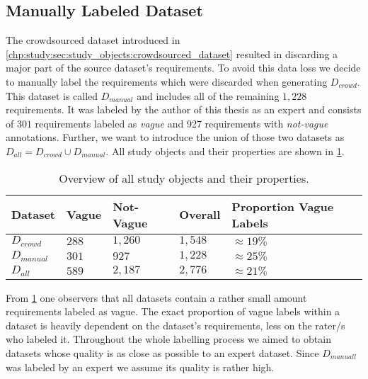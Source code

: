 \subsection{Manually Labeled Dataset}
\label{chp:study:sec:study_objects:dataset_creation:manual_labeling}
The crowdsourced dataset introduced in \cref{chp:study:sec:study_objects:crowdsourced_dataset} resulted in discarding a major part of the source dataset's requirements.
To avoid this data loss we decide to manually label the requirements which were discarded when generating $D_{crowd}$.
This dataset is called $D_{manual}$ and includes all of the remaining $1,228$ requirements.
It was labeled by the author of this thesis as an expert and consists of $301$ requirements labeled as \textit{vague} and 927 requirements with \textit{not-vague} annotations.
Further, we want to introduce the union of those two datasets as $D_{all} = D_{crowd} \cup D_{manual}$.
All study objects and their properties are shown in \cref{tab:study:objects:all_datasets}.
\begin{table}[htpb]
    \centering
    \begin{tabular}{l | l l l l}
        \toprule
        Dataset & Vague & Not-Vague & Overall & Proportion Vague Labels \\
        \midrule
        $D_{crowd}$ & $288$ & $1,260$ & $1,548$ & $\approx19\%$\\
        $D_{manual}$ & $301$ & $927$ & $1,228$ & $\approx25\%$\\
        \midrule
        $D_{all}$ & $589$ & $2,187$ & $2,776$ &  $\approx21\%$\\
        \bottomrule
    \end{tabular}
    \caption[Overview of all study objects]{Overview of all study objects and their properties.}\label{tab:study:objects:all_datasets}
\end{table}

From \cref{tab:study:objects:all_datasets} one observers that all datasets contain a rather small amount requirements labeled as vague.
The exact proportion of vague labels within a dataset is heavily dependent on the dataset's requirements, less on the rater/s who labeled it.
Throughout the whole labelling process we aimed to obtain datasets whose quality is as close as possible to an expert dataset.
Since $D_{manuall}$ was labeled by an expert we assume its quality is rather high.
